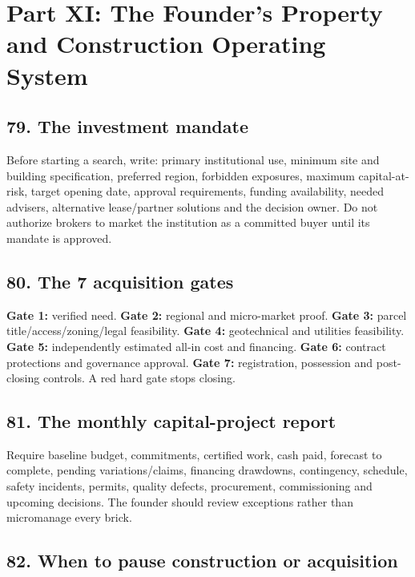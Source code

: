 \section*{Part XI: The Founder's Property and Construction Operating System}


\subsection{79. The investment mandate}

Before starting a search, write: primary institutional use, minimum site and building specification, preferred region, forbidden exposures, maximum capital-at-risk, target opening date, approval requirements, funding availability, needed advisers, alternative lease/partner solutions and the decision owner. Do not authorize brokers to market the institution as a committed buyer until its mandate is approved.


\subsection{80. The 7 acquisition gates}

\textbf{Gate 1:} verified need. \textbf{Gate 2:} regional and micro-market proof. \textbf{Gate 3:} parcel title/access/zoning/legal feasibility. \textbf{Gate 4:} geotechnical and utilities feasibility. \textbf{Gate 5:} independently estimated all-in cost and financing. \textbf{Gate 6:} contract protections and governance approval. \textbf{Gate 7:} registration, possession and post-closing controls. A red hard gate stops closing.


\subsection{81. The monthly capital-project report}

Require baseline budget, commitments, certified work, cash paid, forecast to complete, pending variations/claims, financing drawdowns, contingency, schedule, safety incidents, permits, quality defects, procurement, commissioning and upcoming decisions. The founder should review exceptions rather than micromanage every brick.


\subsection{82. When to pause construction or acquisition}

